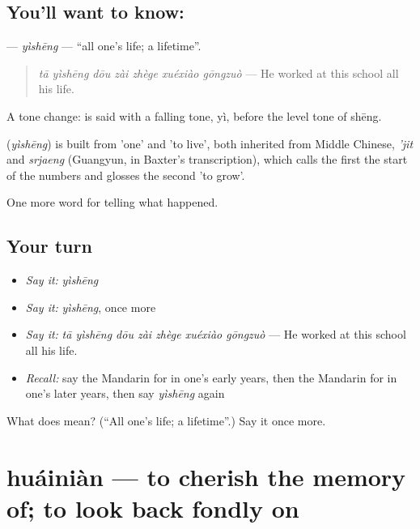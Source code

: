 \subsection*{You'll want to know: }
\textbf{} — \emph{yìshēng} — \textquotedblleft{}all one's life; a lifetime\textquotedblright{}.

\begin{quote}
\textbf{} \emph{tā yìshēng dōu zài zhège xuéxiào gōngzuò} — He worked at this school all his life.
\end{quote}

A tone change:  is said with a falling tone, yì, before the level tone of shēng.

\begin{cousinweb}
\textbf{} (\emph{yìshēng}) is built from  'one' and  'to live', both inherited from Middle Chinese, \emph{'jit} and \emph{srjaeng} (Guangyun, in Baxter's transcription), which calls the first the start of the numbers and glosses the second 'to grow'.
\end{cousinweb}

\begin{grammarlens}[title={What you've built}]
One more word for telling what happened.
\end{grammarlens}

\subsection*{Your turn}
\begin{itemize}
\raggedright
  \item \emph{Say it:} \emph{yìshēng}
  \item \emph{Say it:} \emph{yìshēng}, once more
  \item \emph{Say it:} \emph{tā yìshēng dōu zài zhège xuéxiào gōngzuò} — He worked at this school all his life.
  \item \emph{Recall:} say the Mandarin for in one's early years, then the Mandarin for in one's later years, then say \emph{yìshēng} again
\end{itemize}

\begin{tcolorbox}[breakable,colback=teal!4,colframe=teal!35!black,title={Before you move on}]
What does  mean? (\textquotedblleft{}All one's life; a lifetime\textquotedblright{}.) Say it once more.
\end{tcolorbox}
\section[huáiniàn]{huáiniàn — to cherish the memory of; to look back fondly on}

